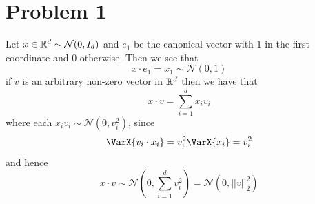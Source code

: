 \documentclass[12pt]{report}
\newcommand{\norm}[1]{\left|\left|#1\right|\right|}
\begin{document}
\maketitle
\section*{Problem 1}
Let $x \in \mathbb{R}^d \sim \mathcal{N}(0,I_d)$ and $e_1$ be the canonical vector with $1$ in the first coordinate and $0$ otherwise. Then we see that
\begin{equation*}
    x \cdot e_1 = x_1 \sim \mathcal{N}(0,1)
\end{equation*}
if $v$ is an arbitrary non-zero vector in $\mathbb{R}^d$ then we have that
\begin{equation*}
    x \cdot v = \sum_{i=1}^d x_iv_i
\end{equation*}
where each $x_iv_i \sim \mathcal{N}(0,v_i^2)$, since
\begin{equation*}
    \VarX{v_i \cdot x_i} = v_i^2 \VarX{x_i} = v_i^2
\end{equation*}
and hence
\begin{equation*}
x \cdot v \sim \mathcal{N}\left(0,\sum_{i=1}^d v_i^2\right) = \mathcal{N}(0, \norm{v}_2^2)
\end{equation*}
\end{document}

